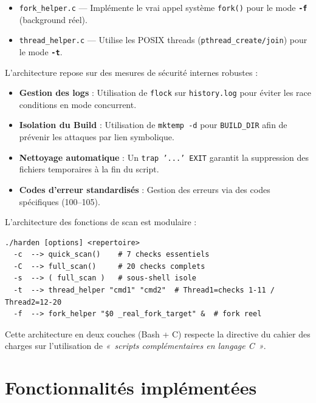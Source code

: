 \documentclass[12pt,a4paper]{article}
\newcommand{\opt}[1]{\texttt{\textcolor{bleuMed}{\textbf{#1}}}}
\newcommand{\cmd}[1]{\texttt{\textcolor{codeText}{#1}}}
\newcommand{\fichier}[1]{\texttt{\textcolor{bleuENSET}{#1}}}
\begin{document}
\begin{itemize}[topsep=2pt, itemsep=2pt]
  \item \fichier{fork\_helper.c} --- Implémente le vrai appel système \cmd{fork()} pour le mode \opt{-f} (background réel).
  \item \fichier{thread\_helper.c} --- Utilise les POSIX threads (\cmd{pthread\_create/join}) pour le mode \opt{-t}.
\end{itemize}

L'architecture repose sur des mesures de sécurité internes robustes :
\begin{itemize}[topsep=2pt, itemsep=2pt]
  \item \textbf{Gestion des logs} : Utilisation de \cmd{flock} sur \fichier{history.log} pour éviter les race conditions en mode concurrent.
  \item \textbf{Isolation du Build} : Utilisation de \cmd{mktemp -d} pour \cmd{BUILD\_DIR} afin de prévenir les attaques par lien symbolique.
  \item \textbf{Nettoyage automatique} : Un \cmd{trap '...' EXIT} garantit la suppression des fichiers temporaires à la fin du script.
  \item \textbf{Codes d'erreur standardisés} : Gestion des erreurs via des codes spécifiques (100--105).
\end{itemize}

L'architecture des fonctions de scan est modulaire :

\begin{lstlisting}[style=bash]
./harden [options] <repertoire>
  -c  --> quick_scan()    # 7 checks essentiels
  -C  --> full_scan()     # 20 checks complets
  -s  --> ( full_scan )   # sous-shell isole
  -t  --> thread_helper "cmd1" "cmd2"  # Thread1=checks 1-11 / Thread2=12-20
  -f  --> fork_helper "$0 _real_fork_target" &  # fork reel
\end{lstlisting}

Cette architecture en deux couches (Bash + C) respecte la directive du cahier des charges sur l'utilisation de \textit{«~scripts complémentaires en langage C~»}.

\newpage

\section{Fonctionnalités implémentées}
\end{document}
